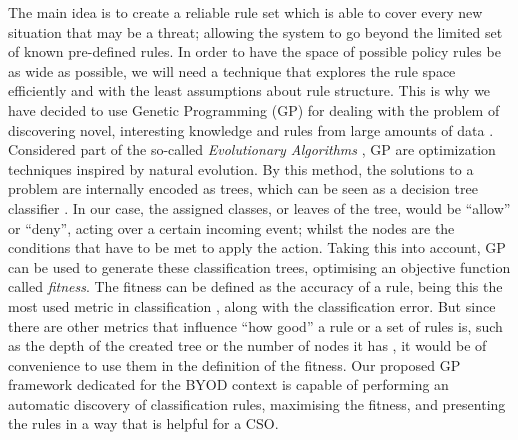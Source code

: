 \documentclass[a4paper,10pt,twocolumn,preprint,3p]{elsarticle}
\begin{document}
The main idea is to create a reliable rule set
which is able to cover every new situation that may be a threat;
allowing the system to go beyond the limited set of known pre-defined
rules. In order to have the space of possible policy rules be as wide
as possible, we will need a technique that explores the rule space
efficiently and with the least assumptions about rule structure. 
This is why we have decided to use Genetic Programming (GP) for dealing with the problem of
discovering novel, interesting knowledge and rules from large
amounts of data \cite{freitas2002data}. Considered part of the so-called \emph{Evolutionary
  Algorithms} \cite{back1996evolutionary}, GP are optimization
techniques inspired by natural evolution. By this method, the
solutions to a problem are internally encoded as trees, which can be
seen as a decision tree classifier \cite{safavian1990survey}. In our case, the assigned classes, or leaves of the tree, would be ``allow'' or ``deny'', acting over a certain incoming event; whilst the nodes are the conditions that have to be met to apply the action. Taking this into account, GP can be used to generate these classification trees, optimising an objective function called {\em fitness}. The fitness can be defined as the accuracy of a rule, being this the most used metric in classification \cite{witten2005data}, along with the classification error. But since there are other metrics that influence ``how good'' a rule or a set of rules is, such as the depth of the created tree or the number of nodes it has \cite{back1996evolutionary}, it would be of convenience to use them in the definition of the fitness.
Our proposed GP framework dedicated
for the BYOD context is capable of performing an automatic discovery
of classification rules, maximising the fitness, and presenting the rules in a way that is helpful for a CSO.
\end{document}
